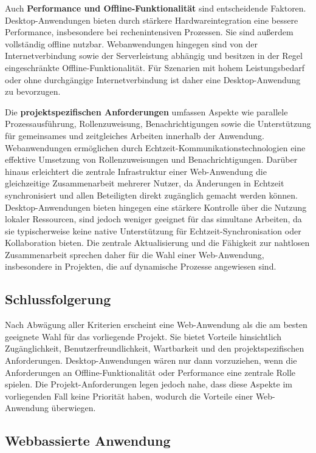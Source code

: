 Auch \textbf{Performance und Offline-Funktionalität} sind entscheidende Faktoren. Desktop-Anwendungen bieten durch stärkere Hardwareintegration eine bessere Performance, insbesondere bei rechenintensiven Prozessen. Sie sind außerdem vollständig offline nutzbar. Webanwendungen hingegen sind von der Internetverbindung sowie der Serverleistung abhängig und besitzen in der Regel eingeschränkte Offline-Funktionalität. Für Szenarien mit hohem Leistungsbedarf oder ohne durchgängige Internetverbindung ist daher eine Desktop-Anwendung zu bevorzugen.

Die \textbf{projektspezifischen Anforderungen} umfassen Aspekte wie parallele Prozessausführung, Rollenzuweisung, Benachrichtigungen sowie die Unterstützung für gemeinsames und zeitgleiches Arbeiten innerhalb der Anwendung. Webanwendungen ermöglichen durch Echtzeit-Kommunikationstechnologien eine effektive Umsetzung von Rollenzuweisungen und Benachrichtigungen. Darüber hinaus erleichtert die zentrale Infrastruktur einer Web-Anwendung die gleichzeitige Zusammenarbeit mehrerer Nutzer, da Änderungen in Echtzeit synchronisiert und allen Beteiligten direkt zugänglich gemacht werden können.
Desktop-Anwendungen bieten hingegen eine stärkere Kontrolle über die Nutzung lokaler Ressourcen, sind jedoch weniger geeignet für das simultane Arbeiten, da sie typischerweise keine native Unterstützung für Echtzeit-Synchronisation oder Kollaboration bieten. Die zentrale Aktualisierung und die Fähigkeit zur nahtlosen Zusammenarbeit sprechen daher für die Wahl einer Web-Anwendung, insbesondere in Projekten, die auf dynamische Prozesse angewiesen sind.

\subsection*{Schlussfolgerung}
Nach Abwägung aller Kriterien erscheint eine Web-Anwendung als die am besten geeignete Wahl für das vorliegende Projekt. Sie bietet Vorteile hinsichtlich Zugänglichkeit, Benutzerfreundlichkeit, Wartbarkeit und den projektspezifischen Anforderungen. Desktop-Anwendungen wären nur dann vorzuziehen, wenn die Anforderungen an Offline-Funktionalität oder Performance eine zentrale Rolle spielen. Die Projekt-Anforderungen legen jedoch nahe, dass diese Aspekte im vorliegenden Fall keine Priorität haben, wodurch die Vorteile einer Web-Anwendung überwiegen.


\iffalse
\subsection*{Webbassierte Anwendung}
